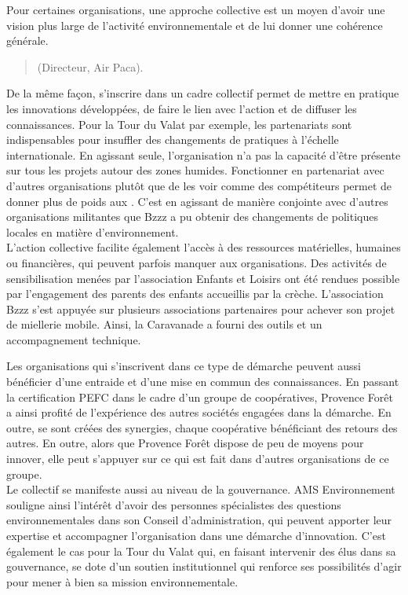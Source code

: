     Pour certaines organisations, une approche collective est un moyen d'avoir une vision plus large de l'activité environnementale et de lui donner une cohérence générale.
    \begin{quotation}
         (Directeur, Air Paca).
    \end{quotation}
    De la même façon, s'inscrire dans un cadre collectif permet de mettre en pratique les innovations développées, de faire le lien avec l'action et de diffuser les connaissances. Pour la Tour du Valat par exemple, les partenariats sont indispensables pour insuffler des changements de pratiques à l'échelle internationale. En agissant seule, l'organisation n'a pas la capacité d'être présente sur tous les projets autour des zones humides. Fonctionner en partenariat avec d'autres organisations plutôt que de les voir comme des compétiteurs permet de donner plus de poids aux \eess. C'est en agissant de manière conjointe avec d'autres organisations militantes que Bzzz a pu obtenir des changements de politiques locales en matière d'environnement. \\

    L'action collective facilite également l'accès à des ressources matérielles, humaines ou financières, qui peuvent parfois manquer aux organisations. Des activités de sensibilisation menées par l'association Enfants et Loisirs ont été rendues possible par l'engagement des parents des enfants accueillis par la crèche. L'association Bzzz s'est appuyée sur plusieurs associations partenaires pour achever son projet de miellerie mobile. Ainsi, la Caravanade a fourni des outils et un accompagnement technique.

    Les organisations qui s'inscrivent dans ce type de démarche peuvent aussi bénéficier d'une entraide et d'une mise en commun des connaissances. En passant la certification PEFC dans le cadre d'un groupe de coopératives, Provence Forêt a ainsi profité de l'expérience des autres sociétés engagées dans la démarche. En outre, se sont créées des synergies, chaque coopérative bénéficiant des retours des autres. En outre, alors que Provence Forêt dispose de peu de moyens pour innover, elle peut s'appuyer sur ce qui est fait dans d'autres organisations de ce groupe. \\

    Le collectif se manifeste aussi au niveau de la gouvernance. AMS Environnement souligne ainsi l'intérêt d'avoir des personnes spécialistes des questions environnementales dans son Conseil d'administration, qui peuvent apporter leur expertise et accompagner l'organisation dans une démarche d'innovation. C'est également le cas pour la Tour du Valat qui, en faisant intervenir des élus dans sa gouvernance, se dote d'un soutien institutionnel qui renforce ses possibilités d'agir pour mener à bien sa mission environnementale. \\


